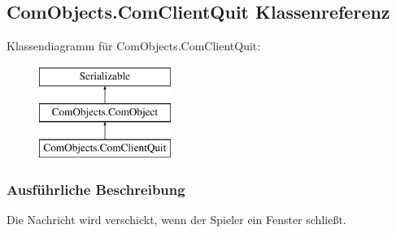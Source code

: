 \hypertarget{a00021}{\subsection{Com\-Objects.\-Com\-Client\-Quit Klassenreferenz}
\label{a00021}
}
Klassendiagramm für Com\-Objects.\-Com\-Client\-Quit\-:\begin{figure}[H]
\begin{center}
\leavevmode
\includegraphics[height=3.000000cm]{a00021}
\end{center}
\end{figure}


\subsubsection{Ausführliche Beschreibung}
Die Nachricht wird verschickt, wenn der Spieler ein Fenster schließt. 